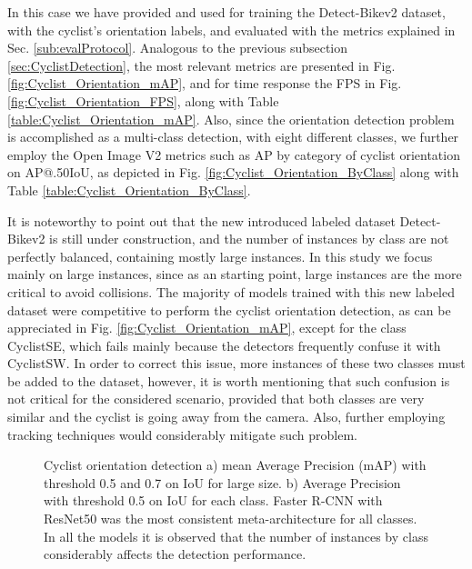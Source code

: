 \documentclass[journal]{IEEEtran}
\begin{document}
In this case we have provided and used for training the Detect-Bikev2 dataset, with the cyclist's orientation labels, and evaluated with the metrics explained in Sec. \ref{sub:evalProtocol}. Analogous to the previous subsection \ref{sec:CyclistDetection}, the most relevant metrics are presented in Fig. \ref{fig:Cyclist_Orientation_mAP}, and for time response the FPS in Fig. \ref{fig:Cyclist_Orientation_FPS}, along with Table \ref{table:Cyclist_Orientation_mAP}. Also, since the orientation detection problem is accomplished as a multi-class detection, with eight different classes, we further employ the Open Image V2 metrics such as AP by category of cyclist orientation on AP@.50IoU, as depicted in Fig. \ref{fig:Cyclist_Orientation_ByClass} along with Table \ref{table:Cyclist_Orientation_ByClass}.

It is noteworthy to point out that the new introduced labeled dataset Detect-Bikev2 is still under construction, and the number of instances by class are not perfectly balanced, containing mostly large instances. In this study we focus mainly on large instances, since as an starting point, large instances are the more critical to avoid collisions. 
The majority of models trained with this new labeled dataset were competitive to perform the cyclist orientation detection, as can be appreciated in Fig. \ref{fig:Cyclist_Orientation_mAP}, except for the class CyclistSE, which fails mainly because the detectors frequently confuse it with CyclistSW. In order to correct this issue, more instances of these two classes must be added to the dataset, however, it is worth mentioning that such confusion is not critical for the considered scenario, provided that both classes are very similar and the cyclist is going away from the camera. Also, further employing tracking techniques would considerably mitigate such problem.

\begin{figure}[ht!]
\begin{center}
    \newline
{}
 \caption{Cyclist orientation detection a) mean Average Precision  (mAP) with threshold 0.5 and 0.7 on IoU for large size. b) Average Precision with threshold 0.5 on IoU for each class. Faster R-CNN with ResNet50 was the most consistent meta-architecture for all classes. In all the models it is observed that the number of instances by class considerably affects the detection performance.
 \label{fig:Cyclist_Orientation_Results}}
\end{center}
\end{figure}
\end{document}
